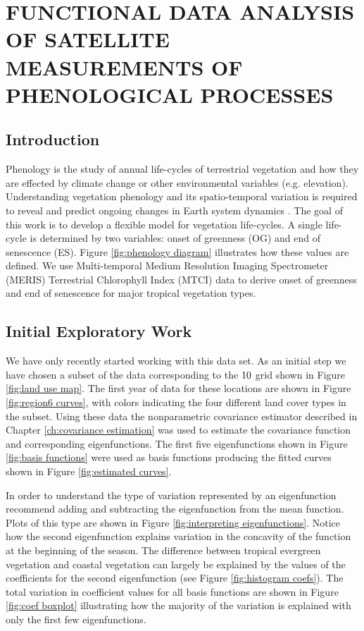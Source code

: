 
\chapter{FUNCTIONAL DATA ANALYSIS OF SATELLITE MEASUREMENTS OF PHENOLOGICAL PROCESSES}
\label{future work}



\section{Introduction}

Phenology is the study of annual life-cycles of terrestrial vegetation and how they are effected by climate change or other environmental variables (e.g. elevation). 
Understanding vegetation phenology and its spatio-temporal variation is required to reveal and predict ongoing changes in Earth system dynamics  \cite{Jeganathan:2010:0921-2973:1125}. The goal of this work is to develop a flexible model for vegetation life-cycles.  A single life-cycle is determined by two variables: onset of greenness (OG) and end of senescence (ES). Figure \ref{fig:phenology diagram} illustrates how these values are defined. We use Multi-temporal Medium Resolution Imaging Spectrometer (MERIS) Terrestrial Chlorophyll Index (MTCI) data to derive onset of greenness and end of senescence for major tropical vegetation types.

\section{Initial Exploratory Work}
We have only recently started working with this data set. As an initial step we have chosen a subset of the data corresponding to the $10\time 10$ grid shown in Figure \ref{fig:land use map}. The first year of data for these locations are shown in Figure \ref{fig:region6 curves}, with colors indicating the four different land cover types in the subset. Using these data the nonparametric covariance estimator described in Chapter \ref{ch:covariance estimation} was used to estimate the covariance function and corresponding eigenfunctions. The first five eigenfunctions shown in Figure \ref{fig:basis functions} were used as basis functions producing the fitted curves shown in Figure \ref{fig:estimated curves}. 

In order to understand the type of variation represented by an eigenfunction \cite{FDA} recommend adding and subtracting the eigenfunction from the mean function. Plots of this type are shown in Figure \ref{fig:interpreting eigenfunctions}. Notice how the second eigenfunction explains variation in the concavity of the function at the beginning of the season. The difference between tropical evergreen vegetation and coastal vegetation can largely be explained by the values of the coefficients for the second eigenfunction (see Figure \ref{fig:histogram coefs}). The total variation in coefficient values for all basis functions are shown in Figure \ref{fig:coef boxplot} illustrating how the majority of the variation is explained with only the first few eigenfunctions. 



